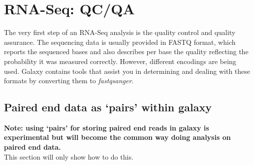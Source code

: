 \section{RNA-Seq: QC/QA}
The very first step of an RNA-Seq analysis is the quality control and quality assurance. The sequencing data is usually provided in FASTQ format, which reports the sequenced bases and also describes per base the quality reflecting the probability it was measured correctly. However, different encodings are being used. Galaxy contains tools that assist you in determining and dealing with these formats by converting them to \textit{fastqsanger}.

\subsection{Paired end data as `pairs' within galaxy}
\textbf{Note: using `pairs' for storing paired end reads in galaxy is experimental but will become the common way doing analysis on paired end data.} \\
This section will only show how to do this.

